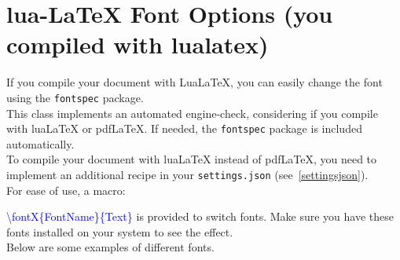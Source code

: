 
\section{lua-\LaTeX{} Font Options (you compiled with lualatex)}

If you compile your document with LuaLaTeX, you can easily change the font using the \texttt{fontspec} package.\\

This class implements an automated engine-check, considering if you compile with luaLaTeX or pdfLaTeX.
If needed, the \texttt{fontspec} package is included automatically.\\

To compile your document with luaLaTeX instead of pdfLaTeX, you need to implement an additional recipe in your \texttt{settings.json} (see~\ref{settingsjson}).\\

For ease of use, a macro:

\textcolor{blue}{\textbackslash fontX\{FontName\}\{Text\}} is provided to switch fonts. 
Make sure you have these fonts installed on your system to see the effect.\\

Below are some examples of different fonts.\\

